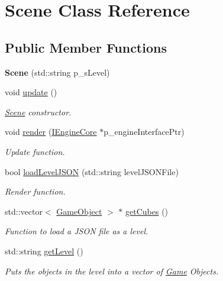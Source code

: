\hypertarget{class_scene}{}\section{Scene Class Reference}
\label{class_scene}
\subsection*{Public Member Functions}
\begin{DoxyCompactItemize}
\item 
\mbox{\label{class_scene_ac37134d2e2d9abad9996c25bb23335f9}} 
{\bfseries Scene} (std\+::string p\+\_\+s\+Level)
\item 
\mbox{\label{class_scene_aa24c7e636c10e4e42650c1374b90bb80}} 
void \mbox{\hyperlink{class_scene_aa24c7e636c10e4e42650c1374b90bb80}{update}} ()
\begin{DoxyCompactList}\small\item\em \mbox{\hyperlink{class_scene}{Scene}} constructor. \end{DoxyCompactList}\item 
\mbox{\label{class_scene_a3cb0abfc84cb1ab6e6d0acb8bd40a205}} 
void \mbox{\hyperlink{class_scene_a3cb0abfc84cb1ab6e6d0acb8bd40a205}{render}} (\mbox{\hyperlink{class_i_engine_core}{I\+Engine\+Core}} $\ast$p\+\_\+engine\+Interface\+Ptr)
\begin{DoxyCompactList}\small\item\em Update function. \end{DoxyCompactList}\item 
bool \mbox{\hyperlink{class_scene_adc40ce0e3e79c9dbb504f42f7a55b153}{load\+Level\+J\+S\+ON}} (std\+::string level\+J\+S\+O\+N\+File)
\begin{DoxyCompactList}\small\item\em Render function. \end{DoxyCompactList}\item 
std\+::vector$<$ \mbox{\hyperlink{class_game_object}{Game\+Object}} $>$ $\ast$ \mbox{\hyperlink{class_scene_accfbee3379223ae8d452b6829dc591dc}{get\+Cubes}} ()
\begin{DoxyCompactList}\small\item\em Function to load a J\+S\+ON file as a level. \end{DoxyCompactList}\item 
\mbox{\label{class_scene_a4b1ae4b8529307db0984c6a9926094cf}} 
std\+::string \mbox{\hyperlink{class_scene_a4b1ae4b8529307db0984c6a9926094cf}{get\+Level}} ()
\begin{DoxyCompactList}\small\item\em Puts the objects in the level into a vector of \mbox{\hyperlink{class_game}{Game}} Objects. \end{DoxyCompactList}\end{DoxyCompactItemize}
